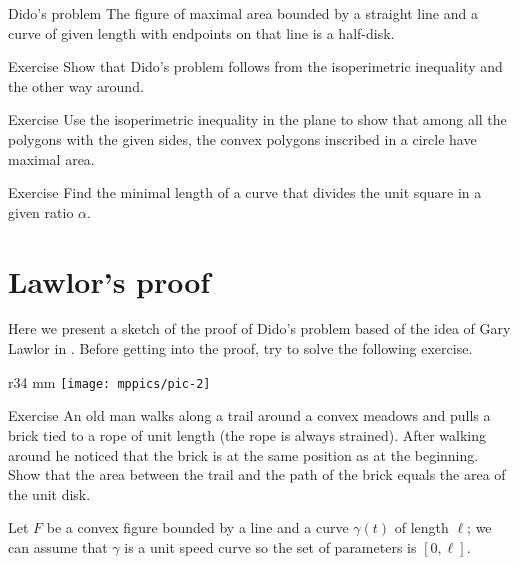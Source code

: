 \begin{thm}{Dido's problem}
The figure of maximal area bounded by a straight line and a curve of given length with endpoints on that line is a half-disk.
\end{thm}

\begin{thm}{Exercise}\label{ex:dido-isop}
Show that Dido's problem follows from the isoperimetric inequality and the other way around.
\end{thm}

\begin{thm}{Exercise}
Use the isoperimetric inequality in the plane to show that 
among all the polygons with the given sides,
the convex polygons inscribed in a circle have maximal area.
\end{thm}

\begin{thm}{Exercise}
Find the minimal length of a curve that divides the unit square in a given ratio $\alpha$.  
\end{thm}

\section{Lawlor's proof}

Here we present a sketch of the proof of Dido's problem based of the idea of Gary Lawlor in \cite{lawlor}.
Before getting into the proof, try to solve the following exercise.

{

\begin{wrapfigure}{r}{34 mm}
\vskip-4mm
\centering
\texttt{[image: mppics/pic-2]}
\end{wrapfigure}

\begin{thm}{Exercise}
An old man walks along a trail around a convex meadows and pulls a brick tied to a rope of unit length (the rope is always strained).
After walking around he noticed that the brick is at the same position as at the beginning.
Show that the area between the trail and the path of the brick equals the area of the unit disk. 
\end{thm}

}

Let $F$ be a convex figure bounded by a line and a curve $\gamma(t)$ of length $\ell$;
we can assume that $\gamma$ is a unit speed curve so the set of parameters is $[0,\ell]$.

